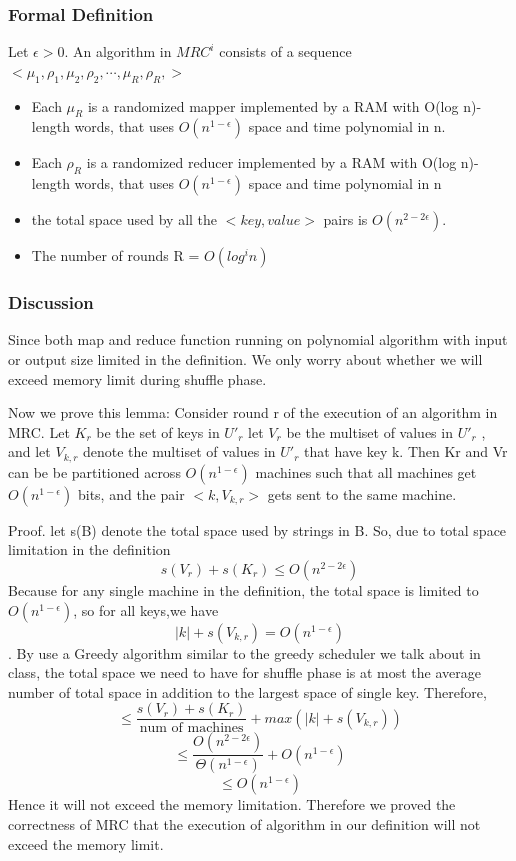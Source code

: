 \documentclass{article}
\begin{document}
      \subsubsection{Formal Definition \cite{model}}

      Let $\epsilon > 0$. An algorithm in $MRC^i$ consists of a sequence $<\mu_1,\rho_1,\mu_2,\rho_2,\cdots, \mu_R,\rho_R,>$
      \begin{itemize}
            \item Each $\mu_R$ is a randomized mapper implemented
            by a RAM with O(log n)-length words, that uses
            $O(n^{1-\epsilon})$ space and time polynomial in n.
            \item Each $\rho_R$ is a randomized reducer implemented
            by a RAM with O(log n)-length words, that uses
            $O(n^{1-\epsilon})$  space and time polynomial in n
            \item the total space used by all the $<key,value>$ pairs is $O(n^{2-2\epsilon})$.
            \item The number of rounds R = $O(log^in)$ 
      \end{itemize}
      \subsubsection{Discussion}
      Since both map and reduce function running on polynomial algorithm with input or output size limited in the definition. We only worry about whether we will
      exceed memory limit during shuffle phase.


      Now we prove this lemma:
      Consider round r of the execution of an
      algorithm in MRC. Let $K_r$ be the set of keys in $U'_r$ let $V_r$ be the multiset of values in $U'_r$
      , and let $V_{k,r}$ denote
      the multiset of values in $U'_r$
      that have key k.
      Then Kr and Vr can be be partitioned across $O(n^{1-\epsilon})$ machines such that all machines get  $O(n^{1-\epsilon})$ 
      bits, and the pair $<k, V_{k,r}>$  gets sent to the same machine.

Proof. let s(B) denote the total space used by strings in B. So, due to total space limitation in the definition
$$s(V_r)+s(K_r) \leq O(n^{2-2\epsilon})$$
Because for any single machine in the definition, the total space is limited to $O(n^{1-\epsilon})$, so for all keys,we have 
$$|k|+ s(V_{k,r}) = O(n^{1-\epsilon})$$.
By use a Greedy algorithm similar to the greedy scheduler we talk about in class, the total space we need to have for shuffle phase is 
at most the average number of total space in addition to the largest space of single key. Therefore,
$$\leq \frac{s(V_r)+s(K_r)}{\text{num of machines}} + max(|k| + s(V_{k,r}))$$
$$\leq \frac{O(n^{2-2\epsilon})}{\Theta(n^{1-\epsilon})}+O(n^{1-\epsilon})$$
$$\leq O(n^{1-\epsilon})$$
Hence it will not exceed the memory limitation.
Therefore we proved the correctness of MRC that the execution of algorithm in our definition will not exceed the memory limit.
\end{document}
